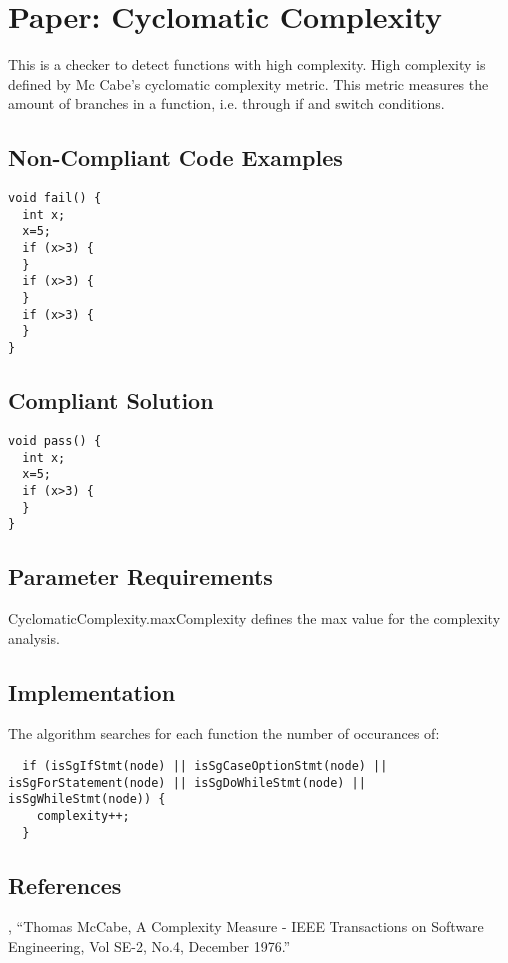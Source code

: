 \section{Paper: Cyclomatic Complexity}

This is a checker to detect functions with high complexity.
High complexity is defined by Mc Cabe's cyclomatic complexity metric.
This metric measures the amount of branches in a function, i.e.
through if and switch conditions.

\subsection{Non-Compliant Code Examples}
\begin{verbatim}
void fail() {
  int x;
  x=5;
  if (x>3) {
  }
  if (x>3) {
  }
  if (x>3) {
  }
}
\end{verbatim}

\subsection{Compliant Solution}
\begin{verbatim}
void pass() {
  int x;
  x=5;
  if (x>3) {
  }
}
\end{verbatim}



\subsection{Parameter Requirements}

CyclomaticComplexity.maxComplexity defines the max value for the complexity analysis.

\subsection{Implementation}

The algorithm searches for each function the number of occurances of:

\begin{verbatim}
  if (isSgIfStmt(node) || isSgCaseOptionStmt(node) || isSgForStatement(node) || isSgDoWhileStmt(node) || isSgWhileStmt(node)) {
    complexity++;
  }
\end{verbatim}

\subsection{References}

 , ``Thomas McCabe, A Complexity Measure - IEEE Transactions on Software Engineering, Vol SE-2, No.4, December 1976.''


